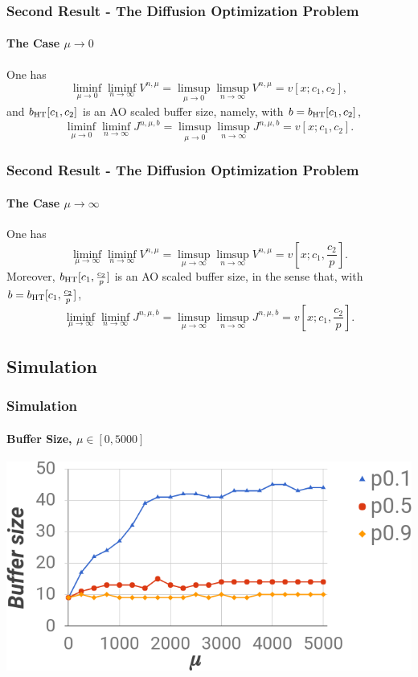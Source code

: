 \documentclass{beamer}
\newcommand{\iy}{\infty}
\newcommand{\HT}{\text{\rm HT}}
\begin{document}
\begin{frame}
\frametitle{Second Result - The Diffusion Optimization Problem}
   \framesubtitle{The Case $\mu\to 0$}

  \begin{theorem}
    \label{th2}
    One has
    \[
    \liminf_{\mu\to0}\liminf_{n\to\iy}V^{n,\mu}
    =\limsup_{\mu\to0}\limsup_{n\to\iy}V^{n,\mu}=v[x;c_1,c_2],
    \]
    and $b_\HT[c_1,c_2]$ is an AO scaled buffer size, namely, with
    $b=b_\HT[c_1,c_2]$,
    \[
    \liminf_{\mu\to 0}\liminf_{n\to\iy}J^{n,\mu,b}
    =\limsup_{\mu\to 0}\limsup_{n\to\iy}J^{n,\mu,b}=v[x;c_1,c_2].
    \]
  \end{theorem}


\end{frame}

\begin{frame}
\frametitle{Second Result - The Diffusion Optimization Problem}
   \framesubtitle{The Case $\mu \to \infty$}

  \begin{theorem}
    \label{th1}
    One has
    \[
    \liminf_{\mu\to\iy}\liminf_{n\to\iy}V^{n,\mu}
    =\limsup_{\mu\to\iy}\limsup_{n\to\iy}V^{n,\mu}=v[x;c_1,\frac{c_2}{p}].
    \]
    Moreover, $b_\HT[c_1,\frac{c_2}{p}]$ is an AO scaled buffer size,
    in the sense that, with $b=b_\HT[c_1,\frac{c_2}{p}]$,
    \[
    \liminf_{\mu\to\iy}\liminf_{n\to\iy}J^{n,\mu,b}
    =\limsup_{\mu\to\iy}\limsup_{n\to\iy}J^{n,\mu,b}=v[x;c_1,\frac{c_2}{p}].
    \]
  \end{theorem}

\end{frame}

\subsection{Simulation}


\begin{frame}
  \frametitle{Simulation}
  \framesubtitle{Buffer Size, $\mu \in [0,5000]$}
  \begin{center}
    \includegraphics[width=1\textwidth]{pictures/bsim0-5000.png}
  \end{center}

\end{frame}
\end{document}
